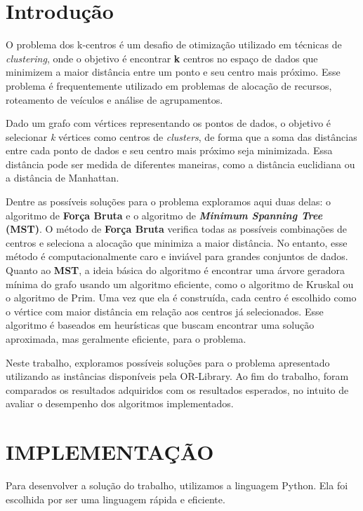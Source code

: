 \section{\esp Introdução}

O problema dos k-centros é um desafio de otimização utilizado em técnicas de \textit{clustering}, onde o objetivo é encontrar \textbf{k} centros no espaço de dados que minimizem a maior distância entre um ponto e seu centro mais próximo. Esse problema é frequentemente utilizado em problemas de alocação de recursos, roteamento de veículos e análise de agrupamentos.

Dado um grafo com vértices representando os pontos de dados, o objetivo é selecionar \textit{k} vértices como centros de \textit{clusters}, de forma que a soma das distâncias entre cada ponto de dados e seu centro mais próximo seja minimizada. Essa distância pode ser medida de diferentes maneiras, como a distância euclidiana ou a distância de Manhattan.

Dentre as possíveis soluções para o problema exploramos aqui duas delas: o algoritmo de \textbf{Força Bruta} e o algoritmo de \textbf{\textit{Minimum Spanning Tree} (MST)}. O método de \textbf{Força Bruta} verifica todas as possíveis combinações de centros e seleciona a alocação que minimiza a maior distância. No entanto, esse método é computacionalmente caro e inviável para grandes conjuntos de dados. Quanto ao \textbf{MST}, a ideia básica do algoritmo é encontrar uma árvore geradora mínima do grafo usando um algoritmo eficiente, como o algoritmo de Kruskal ou o algoritmo de Prim. Uma vez que ela é construída, cada centro é escolhido como o vértice com maior distância em relação aos centros já selecionados. Esse algoritmo é baseados em heurísticas que buscam encontrar uma solução aproximada, mas geralmente eficiente, para o problema. 

Neste trabalho, exploramos possíveis soluções para o problema apresentado utilizando as instâncias disponíveis pela OR-Library. Ao fim do trabalho, foram comparados os resultados adquiridos com os resultados esperados, no intuito de avaliar o desempenho dos algoritmos implementados. 

\section{\esp IMPLEMENTAÇÃO}

Para desenvolver a solução do trabalho, utilizamos a linguagem Python. Ela foi escolhida por ser uma linguagem rápida e eficiente. 


